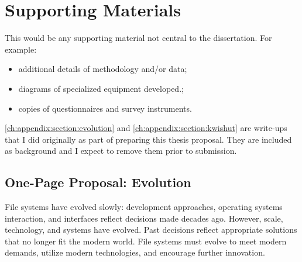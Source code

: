 \chapter{Supporting Materials}

This would be any supporting material not central to the dissertation.
For example:
\begin{itemize}
    \item additional details of methodology and/or data;
    \item diagrams of specialized equipment developed.;
    \item copies of questionnaires and survey instruments.
\end{itemize}

\autoref{ch:appendix:section:evolution} and
\autoref{ch:appendix:section:kwishut} are write-ups that I did originally as
part of preparing this thesis proposal.  They are included as background and I
expect to remove them prior to submission.

\section{One-Page Proposal: Evolution}
\label{ch:appendix:section:evolution}

File systems have evolved slowly: development approaches, operating systems
interaction, and interfaces reflect decisions made decades ago.  However, scale,
technology, and systems have evolved.  Past decisions reflect appropriate
solutions that no longer fit the modern world.  File systems must evolve to meet
modern demands, utilize modern technologies, and encourage further innovation.


